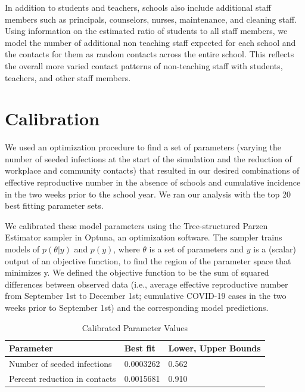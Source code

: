 \documentclass[preprint,12pt]{elsarticle}
\begin{document}
In addition to students and teachers, schools also include additional staff members such as principals, counselors, nurses, maintenance, and cleaning staff. Using information on the estimated ratio of students to all staff members, we model the number of additional non teaching staff expected for each school and the contacts for them as random contacts across the entire school. This reflects the overall more varied contact patterns of non-teaching staff with students, teachers, and other staff members.

\section{Calibration}
\label{sec:AppendixB}

We used an optimization procedure to find a set of parameters (varying the number of seeded infections at the start of the simulation and the reduction of workplace and community contacts) that resulted in our desired combinations of effective reproductive number in the absence of schools and cumulative incidence in the two weeks prior to the school year. We ran our analysis with the top 20 best fitting parameter sets.

We calibrated these model parameters using the Tree-structured Parzen Estimator sampler in Optuna, an optimization software. The sampler trains models of $p(\theta|y)$ and $p(y)$, where $\theta$ is a set of parameters and $y$ is a (scalar) output of an objective function, to find the region of the parameter space that minimizes y. We defined the objective function to be the sum of squared differences between observed data (i.e., average effective reproductive number from September 1st to December 1st; cumulative COVID-19 cases in the two weeks prior to September 1st) and the corresponding model predictions. 


\begin{table}[h]
\centering
\begin{tabular}{l l l}
\hline
\textbf{Parameter} & \textbf{Best fit} & \textbf{Lower, Upper Bounds}\\
\hline
Number of seeded infections & 0.0003262 & 0.562 \\
Percent reduction in contacts & 0.0015681 & 0.910 \\
\hline
\end{tabular}
\caption{Calibrated Parameter Values}
\end{table}
\end{document}
